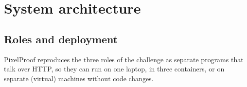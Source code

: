 \section{System architecture}\label{sec:arch}

\subsection{Roles and deployment}
PixelProof reproduces the three roles of the challenge as separate programs that talk over HTTP, so they can run on one laptop, in three containers, or on separate (virtual) machines without code changes.

